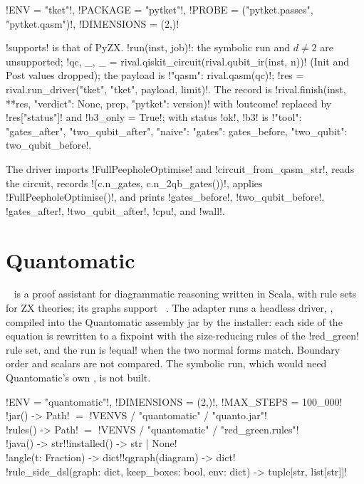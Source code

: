 \begin{signature}
\py!ENV = "tket"!, \py!PACKAGE = "pytket"!, \py!PROBE = ("pytket.passes", "pytket.qasm")!, \py!DIMENSIONS = (2,)!
\end{signature}

\py!supports! is that of PyZX. \py!run(inst, job)!: the symbolic run and $d\neq2$ are unsupported; \py!qc, _, _ = rival.qiskit_circuit(rival.qubit_ir(inst, n))! (Init and Post values dropped); the payload is \py!{"qasm": rival.qasm(qc)}!; \py!res = rival.run_driver("tket", "tket", payload, limit)!. The record is \py!rival.finish(inst, {**res, "verdict": None}, prep, {"pytket": version})! with \code!outcome! replaced by \code!res["status"]! and \py!b3_only = True!; with status \code!ok!, \code!b3! is \py!{"tool": {"gates_after", "two_qubit_after"}, "naive": {"gates": gates_before, "two_qubit": two_qubit_before}}!.

The driver  imports \py!FullPeepholeOptimise! and \py!circuit_from_qasm_str!, reads the circuit, records \py!(c.n_gates, c.n_2qb_gates())!, applies \py!FullPeepholeOptimise()!, and prints \code!gates_before!, \code!two_qubit_before!, \code!gates_after!, \code!two_qubit_after!, \code!cpu!, and \code!wall!.

\section{Quantomatic}\label{sec:bench-tools-quantomatic}

~\cite{kissinger2015quantomatic} is a proof assistant for diagrammatic reasoning written in Scala, with rule sets for ZX theories; its graphs support \bboxes{}~\cite{kissinger2014pattern}. The adapter runs a headless driver, , compiled into the Quantomatic assembly jar by the installer: each side of the equation is rewritten to a fixpoint with the size-reducing rules of the \code!red_green! rule set, and the run is \code!equal! when the two normal forms match. Boundary order and scalars are not compared. The symbolic run, which would need Quantomatic's own \bboxes{}, is not built.

\begin{signature}
\py!ENV = "quantomatic"!, \py!DIMENSIONS = (2,)!, \py!MAX_STEPS = 100_000!\\
\py!jar() -> Path! $=$ \py!VENVS / "quantomatic" / "quanto.jar"!\\
\py!rules() -> Path! $=$ \py!VENVS / "quantomatic" / "red_green.rules"!\\
\py!java() -> str!\quad\py!installed() -> str | None!\\
\py!angle(t: Fraction) -> dict!\quad\py!qgraph(diagram) -> dict!\\
\py!rule_side_dsl(graph: dict, keep_boxes: bool, env: dict) -> tuple[str, list[str]]!
\end{signature}

